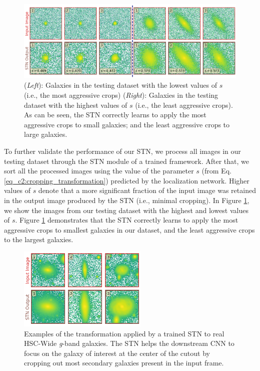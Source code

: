 \begin{figure}[htb]
    \centering
    \includegraphics[width
    =\textwidth]{most_least_crops.png}
    \caption{(\textit{Left}): Galaxies in the testing dataset with the lowest values of $s$ (i.e., the most aggressive crops) (\textit{Right}): Galaxies in the testing dataset with the highest values of $s$ (i.e., the least aggressive crops). As can be seen, the STN correctly learns to apply the most aggressive crops to small galaxies; and the least aggressive crops to large galaxies.}
    \label{fig_c2:most_least_crops}
\end{figure}

To further validate the performance of our STN, we process all images in our testing dataset through the STN module of a trained \gampen{} framework. After that, we sort all the processed images using the value of the parameter $s$ (from Eq. \ref{eq_c2:cropping_transformation}) predicted by the localization network. Higher values of $s$ denote that a more significant fraction of the input image was retained in the output image produced by the STN  (i.e., minimal cropping). In Figure \ref{fig_c2:most_least_crops}, we show the images from our testing dataset with the highest and lowest values of $s$. Figure \ref{fig_c2:most_least_crops} demonstrates that the STN correctly learns to apply the most aggressive crops to smallest galaxies in our dataset, and the least aggressive crops to the largest galaxies.

\begin{figure}[htb]
    \centering
    \includegraphics[width
    =0.55\textwidth]{real_galaxies_stn.png}
    \caption{Examples of the transformation applied by a trained STN to real HSC-Wide \textit{g}-band galaxies. The STN helps the downstream CNN to focus on the galaxy of interest at the center of the cutout by cropping out most secondary galaxies present in the input frame.}
    \label{fig_c2:real_galaxies_stn}
\end{figure}

